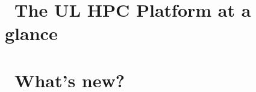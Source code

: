 \documentclass{article}
\begin{document}
\ulhpctoc

\begin{welcome}
  
\end{welcome}

   
\section{\faCommentAlt\ The UL HPC Platform at a glance}

\clearpage


\section{\faBullhorn\ What's new?}


\clearpage


\newpage






\end{document}
